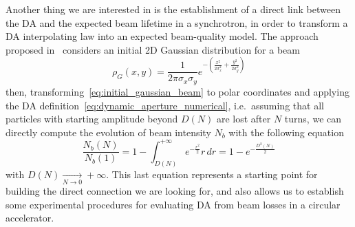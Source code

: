 Another thing we are interested in is the establishment of a direct link between the DA and the expected beam lifetime in a synchrotron, in order to transform a DA interpolating law into an expected beam-quality model. The approach proposed in~\cite{giovannozzi2012proposed} considers an initial 2D Gaussian distribution for a beam
\begin{equation}
	\rho_G(x,y) = \frac{1}{2\pi\sigma_x\sigma_y}e^{-\left(\frac{x^2}{2\sigma_x^2}+\frac{y^2}{2\sigma_y^2}\right)}
	\label{eq:initial_gaussian_beam}
\end{equation}
then, transforming~\eqref{eq:initial_gaussian_beam} to polar coordinates and applying the DA definition~\eqref{eq:dynamic_aperture_numerical}, i.e.\ assuming that all particles with starting amplitude beyond \(D(N)\) are lost after \(N\) turns, we can directly compute the evolution of beam intensity \(N_b\) with the following equation
\begin{equation}
	\frac{N_b(N)}{N_b(1)} = 1 - \int_{D(N)}^{+\infty} e^{-\frac{r^2}{2}} r \, dr = 1 - e^{-\frac{D^2(N)}{2}}
	\label{eq:measuring_da}
\end{equation}
with \(D(N) \xrightarrow[N \to 0]{} +\infty \). This last equation represents a starting point for building the direct connection we are looking for, and also allows us to establish some experimental procedures for evaluating DA from beam losses in a circular accelerator.